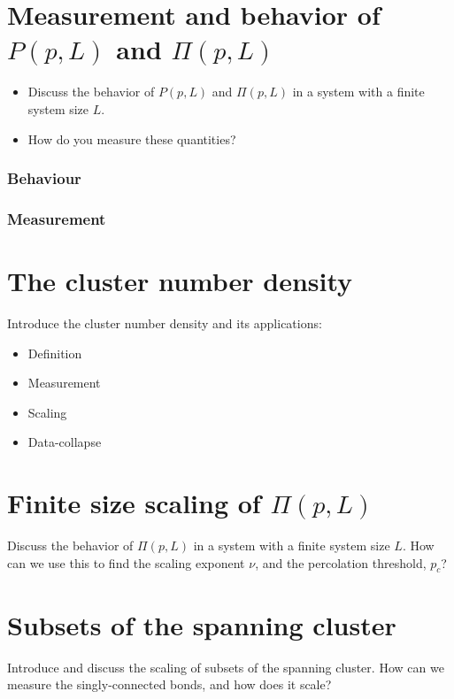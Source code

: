 \documentclass[a4paper, 11pt, notitlepage, english]{article}
\begin{document}
\clearpage

\section{Measurement and behavior of $P(p, L)$ and $\Pi(p, L)$}
\begin{itemize}
\item Discuss the behavior of $P(p, L)$ and $\Pi(p, L)$ in a system with a finite system
size $L$.
\item How do you measure these quantities?
\end{itemize}

\subsubsection*{Behaviour}
\subsubsection*{Measurement}


 

\clearpage

\section{The cluster number density}
Introduce the cluster number density and its applications: 
\begin{itemize}
	\item Definition
	\item Measurement
	\item Scaling
	\item Data-collapse
\end{itemize}

\clearpage

\section{ Finite size scaling of $\Pi(p, L)$}
Discuss the behavior of $\Pi(p, L)$ in a system with a finite system size $L$. How
can we use this to find the scaling exponent $\nu$, and the percolation threshold, $p_c$?

\clearpage

\section{ Subsets of the spanning cluster}
Introduce and discuss the scaling of subsets of the spanning cluster. How can
we measure the singly-connected bonds, and how does it scale?
\end{document}
